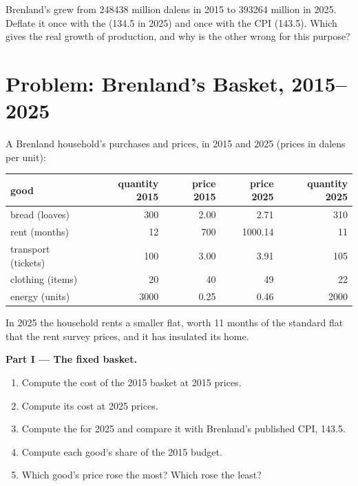 \begin{exercise}[$\star\star\star$]\label{exo:g10:price-indices:15}
Brenland's  grew from \num{248438} million dalens in 2015 to \num{393264} million in 2025. Deflate it once with the  (134.5 in 2025) and once
with the CPI (143.5). Which gives the real growth of production, and why is the other wrong for this purpose?
\end{exercise}

\section{Problem: Brenland's Basket, 2015--2025}

\begin{problem}
\label{pb:g10:price-indices:1}
A Brenland household's purchases and prices, in 2015 and 2025 (prices in dalens per unit):
\begin{center}
\small
\begin{tabular}{l r r r r}
\toprule
good & quantity 2015 & price 2015 & price 2025 & quantity 2025 \\
\midrule
bread (loaves) & 300 & 2.00 & 2.71 & 310 \\
rent (months) & 12 & 700 & 1000.14 & 11 \\
transport (tickets) & 100 & 3.00 & 3.91 & 105 \\
clothing (items) & 20 & 40 & 49 & 22 \\
energy (units) & 3000 & 0.25 & 0.46 & 2000 \\
\bottomrule
\end{tabular}
\end{center}
In 2025 the household rents a smaller flat, worth 11 months of the standard flat that the rent survey prices, and it has insulated its home.

\medskip
\noindent\textbf{Part I --- The fixed basket.}
\begin{enumerate}
\item Compute the cost of the 2015 basket at 2015 prices.
\item Compute its cost at 2025 prices.
\item Compute the  for 2025 and compare it with Brenland's published CPI, 143.5.
\item Compute each good's share of the 2015 budget.
\item Which good's price rose the most? Which rose the least?
\end{enumerate}


\end{problem}
